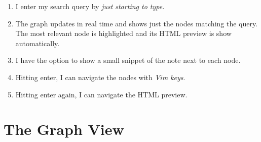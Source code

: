 \documentclass{article}
\begin{document}
\begin{enumerate}
	\item I enter my search query by \emph{just starting to type.}

	\item The graph updates in real time and shows just the nodes matching the query. The most relevant node is highlighted and its HTML preview is show automatically.

	\item I have the option to show a small snippet of the note next to each node.

	\item Hitting enter, I can navigate the nodes with \emph{Vim keys}.

	\item Hitting enter again, I can navigate the HTML preview.
\end{enumerate}

\section{The Graph View}\label{graph_view}
\end{document}
